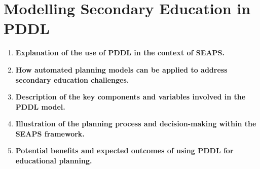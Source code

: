 \section{Modelling Secondary Education in PDDL}
\begin{enumerate}
    \item \textbf{Explanation of the use of PDDL in the context of SEAPS.}
    \item \textbf{How automated planning models can be applied to address secondary education challenges.}
    \item \textbf{Description of the key components and variables involved in the PDDL model.}
    \item \textbf{Illustration of the planning process and decision-making within the SEAPS framework.}
    \item \textbf{Potential benefits and expected outcomes of using PDDL for educational planning.}
\end{enumerate}
